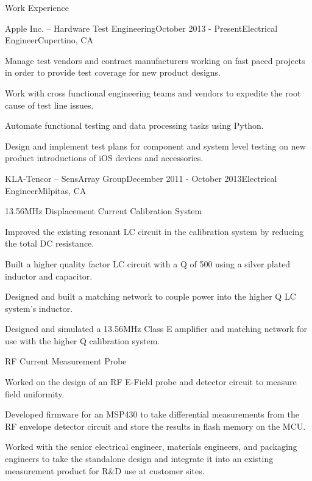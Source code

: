 \documentclass{resume} %
\begin{document}
\begin{rSection}{Work Experience}
\begin{rSubsection}{Apple Inc. -- Hardware Test Engineering}{October 2013 - Present}{Electrical Engineer}{Cupertino, CA}
\item Manage test vendors and contract manufacturers working on fast paced projects in order to provide test coverage for new product designs.
\item Work with cross functional engineering teams and vendors to expedite the root cause of test line issues.
\item Automate functional testing and data processing tasks using Python.
\item Design and implement test plans for component and system level testing on new product introductions of iOS devices and accessories.
\end{rSubsection}


\begin{rSubsection2}{KLA-Tencor -- SensArray Group}{December 2011 - October 2013}{Electrical Engineer}{Milpitas, CA}

\pagebreak[2]
\begin{rWorkProject}{13.56MHz Displacement Current Calibration System}
\item Improved the existing resonant LC circuit in the calibration system by reducing the total DC resistance.
\item Built a higher quality factor LC circuit with a Q of 500 using a silver plated inductor and capacitor.
\item Designed and built a matching network to couple power into the higher Q LC system's inductor.
\item Designed and simulated a 13.56MHz Class E amplifier and matching network for use with the higher Q calibration system.
\end{rWorkProject}

\pagebreak[2]
\begin{rWorkProject}{RF Current Measurement Probe}
\item Worked on the design of an RF E-Field probe and detector circuit to measure field uniformity.
\item Developed firmware for an MSP430 to take differential measurements from the RF envelope detector circuit and store the results in flash memory on the MCU.
\item Worked with the senior electrical engineer, materials engineers, and packaging engineers to take the standalone design and integrate it into an existing measurement product for R\&D use at customer sites.
\end{rWorkProject}


\end{rSubsection2}
\end{rSection}
\end{document}
